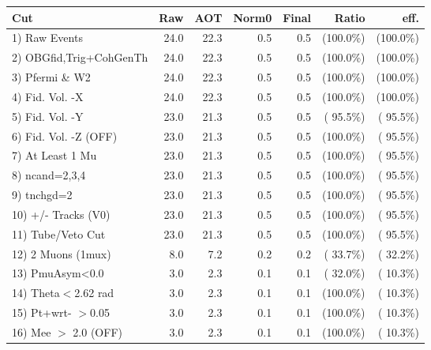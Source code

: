  \begin{table}[h!]\centering
 \begin{tabular}{||l||r|r|r|r|r|r||}
 \hline
 \hline
 Cut & Raw & AOT & Norm0 & Final & Ratio & eff.       \\
 \hline
  1) Raw Events           &         24.0 &         22.3 &          0.5 &          0.5 & (100.0\%) & (100.0\%) \\
  2) OBGfid,Trig+CohGenTh &         24.0 &         22.3 &          0.5 &          0.5 & (100.0\%) & (100.0\%) \\
  3) Pfermi \& W2         &         24.0 &         22.3 &          0.5 &          0.5 & (100.0\%) & (100.0\%) \\
  4) Fid. Vol. -X         &         24.0 &         22.3 &          0.5 &          0.5 & (100.0\%) & (100.0\%) \\
  5) Fid. Vol. -Y         &         23.0 &         21.3 &          0.5 &          0.5 & ( 95.5\%) & ( 95.5\%) \\
  6) Fid. Vol. -Z (OFF)   &         23.0 &         21.3 &          0.5 &          0.5 & (100.0\%) & ( 95.5\%) \\
  7) At Least 1 Mu        &         23.0 &         21.3 &          0.5 &          0.5 & (100.0\%) & ( 95.5\%) \\
  8) ncand=2,3,4          &         23.0 &         21.3 &          0.5 &          0.5 & (100.0\%) & ( 95.5\%) \\
  9) tnchgd=2             &         23.0 &         21.3 &          0.5 &          0.5 & (100.0\%) & ( 95.5\%) \\
 10) +/- Tracks (V0)      &         23.0 &         21.3 &          0.5 &          0.5 & (100.0\%) & ( 95.5\%) \\
 11) Tube/Veto Cut        &         23.0 &         21.3 &          0.5 &          0.5 & (100.0\%) & ( 95.5\%) \\
 12) 2 Muons (1mux)       &          8.0 &          7.2 &          0.2 &          0.2 & ( 33.7\%) & ( 32.2\%) \\
 13) PmuAsym<0.0          &          3.0 &          2.3 &          0.1 &          0.1 & ( 32.0\%) & ( 10.3\%) \\
 14) Theta$<$2.62 rad     &          3.0 &          2.3 &          0.1 &          0.1 & (100.0\%) & ( 10.3\%) \\
 15) Pt+wrt- $>$0.05      &          3.0 &          2.3 &          0.1 &          0.1 & (100.0\%) & ( 10.3\%) \\
 16) Mee $>$ 2.0  (OFF)   &          3.0 &          2.3 &          0.1 &          0.1 & (100.0\%) & ( 10.3\%) \\

\end{tabular}
\end{table}
